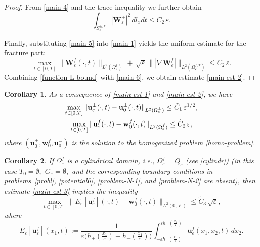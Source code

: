 \documentclass[reqno]{amsart}            %
\newtheorem{corollary}{Corollary}[section]
\numberwithin{equation}{section}
\begin{document}
\begin{proof}
		From \eqref{main-4} and the trace inequality we further obtain
		\begin{equation}\label{main-5}
			\int_{S_\varepsilon^{\pm, \tau}} |\mathbf{W}^\pm_\varepsilon|^2 \, dl_xdt \le C_2 \, \varepsilon.
		\end{equation}
		
		Finally, substituting \eqref{main-5} into \eqref{main-1} yields the uniform estimate for the fracture part:
		\begin{equation}\label{main-6}
			\max_{t\in [0,T]} \|\mathbf{W}^{f}_\varepsilon(\cdot,t)\|_{L^2(\Omega_\varepsilon^{f})} \, + \, 
			\sqrt{\varepsilon} \, \||\nabla\mathbf{W}^{f}_\varepsilon|\|_{L^2(\Omega_\varepsilon^{f,T})} \le C_2 \, \varepsilon.
		\end{equation}
		Combining \eqref{function-L-bound} with \eqref{main-6}, we obtain estimate \eqref{main-est-2}.
	\end{proof}
	
	\begin{corollary}
		As a consequence of \eqref{main-est-1} and \eqref{main-est-2}, we have
		\begin{gather}
			\max_{t\in [0,T]} \|\mathbf{u}^\pm_\varepsilon(\cdot,t) - \mathbf{u}^\pm_0(\cdot,t)\|_{L^2(\Omega_\varepsilon^{\pm})}  \le \tilde{C}_1 \, \varepsilon^{1/2}, \notag 
			\\ \label{main-est-3}
			\max_{t\in [0,T]} \|\mathbf{u}^f_\varepsilon(\cdot,t) - \mathbf{w}^f_0(\cdot,t)\|_{L^2(\Omega_\varepsilon^{f})} \le \tilde{C}_2 \, \varepsilon,
		\end{gather}
		where $(\mathbf{u}^+_0, \mathbf{w}^f_0, \mathbf{u}^-_0)$ is the solution to the homogenized problem \eqref{homo-problem}. 
	\end{corollary}
	\begin{corollary}
		If $\Omega_\varepsilon^{f}$ is a cylindrical domain, i.e., $\Omega_\varepsilon^{f} = Q_\varepsilon$ (see \eqref{cylindr})  (in this case
		$T_0 = \emptyset,$ $G_\varepsilon = \emptyset,$
		and the corresponding boundary conditions in problems~\eqref{probl}, \eqref{potential0}, 
		\eqref{problem-N-1}, and \eqref{problem-N-2} are absent), then estimate \eqref{main-est-3} implies the inequality
		\begin{equation*}
			\max_{t\in [0,T]} \big\|E_\varepsilon[\mathbf{u}^f_\varepsilon](\cdot,t) - \mathbf{w}^f_0(\cdot,t)\big\|_{L^2(0, \ell)} \le \tilde{C}_3 \, \sqrt{\varepsilon},
		\end{equation*}
		where
		$$
		E_\varepsilon[\mathbf{u}^f_\varepsilon](x_1, t) := \frac{1}{\varepsilon \big(h_+(\frac{x_1}{\varepsilon}) + h_-(\frac{x_1}{\varepsilon})\big)}
		\int_{-\varepsilon h_-(\frac{x_1}{\varepsilon})}^{\varepsilon h_+(\frac{x_1}{\varepsilon})} \mathbf{u}^f_\varepsilon(x_1, x_2,t) \, dx_2.
		$$
	\end{corollary}
	
\end{document}
